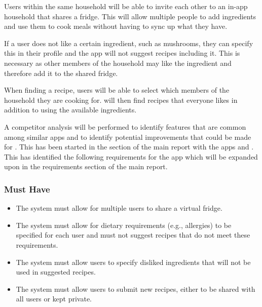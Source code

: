 \documentclass[../CHEFCookingHelperForEveryonesFridge.tex]{subfiles}
\begin{document}
Users within the same household will be able to invite each other to an in-app household that shares a fridge.
This will allow multiple people to add ingredients and use them to cook meals without having to sync up
what they have.

If a user does not like a certain ingredient, such as mushrooms, they can specify this in their profile and
the \chef{} app will not suggest recipes including it. This is necessary as other members of the household
may like the ingredient and therefore add it to the shared fridge.

When finding a recipe, users will be able to select which members of the household they are cooking for.
\chef{} will then find recipes that everyone likes in addition to using the available ingredients.

A competitor analysis will be performed to identify features that are common among similar apps and to identify potential
improvements that could be made for \chef{}. This has been started in the 
section of the main report with the apps  \cite{myfridgefood_myfridgefood_nodate} and \cite{supercook_supercook_nodate}.
This has identified the following requirements for the \chef{} app which will be expanded upon in the requirements section
of the main report.

\subsubsection{Must Have}
\begin{itemize}
    \item The system must allow for multiple users to share a virtual fridge.
    \item The system must allow for dietary requirements (e.g., allergies) to be specified for each user and must not suggest recipes that do not meet these requirements.
    \item The system must allow users to specify disliked ingredients that will not be used in suggested recipes.
    \item The system must allow users to submit new recipes, either to be shared with all users or kept private.
\end{itemize}
\end{document}
